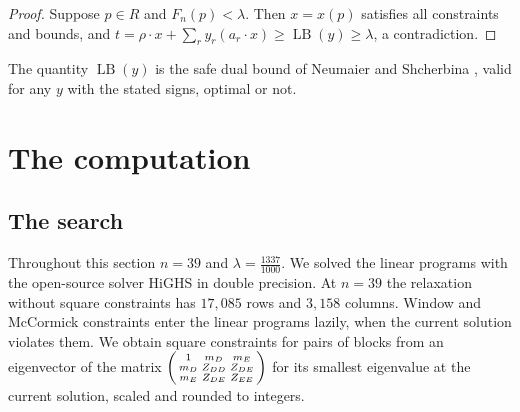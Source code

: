 \documentclass[11pt]{amsart}
\theoremstyle{definition}
\theoremstyle{remark}
\numberwithin{equation}{section}
\newcommand{\LB}{\operatorname{LB}}
\newcommand{\LAM}{\tfrac{1337}{1000}}
\newcommand{\Nbins}{39}
\newcommand{\LProws}{17{,}085}
\newcommand{\LPcols}{3{,}158}
\begin{document}
\begin{proof}
Suppose $p\in R$ and $F_n(p)<\lambda$. Then $x=x(p)$ satisfies all constraints and bounds, and $t=\rho\cdot x+\sum_ry_r(a_r\cdot x)\ge\LB(y)\ge\lambda$, a contradiction.
\end{proof}

The quantity $\LB(y)$ is the safe dual bound of Neumaier and Shcherbina \cite{NS04}, valid for any $y$ with the stated signs, optimal or not.

\section{The computation}\label{sec:computation}

\subsection{The search} Throughout this section $n=\Nbins$ and $\lambda=\LAM$. We solved the linear programs with the open-source solver HiGHS \cite{HiGHS} in double precision. At $n=\Nbins$ the relaxation without square constraints has $\LProws$ rows and $\LPcols$ columns. Window and McCormick constraints enter the linear programs lazily, when the current solution violates them. We obtain square constraints for pairs of blocks from an eigenvector of the matrix $\begin{psmallmatrix}1&m_D&m_E\\m_D&Z_{DD}&Z_{DE}\\m_E&Z_{DE}&Z_{EE}\end{psmallmatrix}$ for its smallest eigenvalue at the current solution, scaled and rounded to integers.
\end{document}

